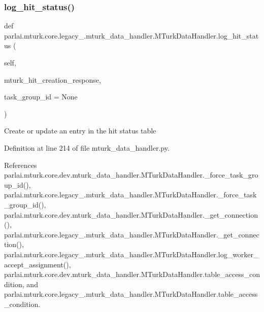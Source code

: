 \subsubsection{\texorpdfstring{log\+\_\+hit\+\_\+status()}{log\_hit\_status()}}
{\footnotesize\ttfamily def parlai.\+mturk.\+core.\+legacy\+\_.\+mturk\+\_\+data\+\_\+handler.\+M\+Turk\+Data\+Handler.\+log\+\_\+hit\+\_\+status (\begin{DoxyParamCaption}\item[{}]{self,  }\item[{}]{mturk\+\_\+hit\+\_\+creation\+\_\+response,  }\item[{}]{task\+\_\+group\+\_\+id = {\ttfamily None} }\end{DoxyParamCaption})}

\begin{DoxyVerb}Create or update an entry in the hit status table\end{DoxyVerb}
 

Definition at line 214 of file mturk\+\_\+data\+\_\+handler.\+py.



References parlai.\+mturk.\+core.\+dev.\+mturk\+\_\+data\+\_\+handler.\+M\+Turk\+Data\+Handler.\+\_\+force\+\_\+task\+\_\+group\+\_\+id(), parlai.\+mturk.\+core.\+legacy\+\_.\+mturk\+\_\+data\+\_\+handler.\+M\+Turk\+Data\+Handler.\+\_\+force\+\_\+task\+\_\+group\+\_\+id(), parlai.\+mturk.\+core.\+dev.\+mturk\+\_\+data\+\_\+handler.\+M\+Turk\+Data\+Handler.\+\_\+get\+\_\+connection(), parlai.\+mturk.\+core.\+legacy\+\_.\+mturk\+\_\+data\+\_\+handler.\+M\+Turk\+Data\+Handler.\+\_\+get\+\_\+connection(), parlai.\+mturk.\+core.\+legacy\+\_.\+mturk\+\_\+data\+\_\+handler.\+M\+Turk\+Data\+Handler.\+log\+\_\+worker\+\_\+accept\+\_\+assignment(), parlai.\+mturk.\+core.\+dev.\+mturk\+\_\+data\+\_\+handler.\+M\+Turk\+Data\+Handler.\+table\+\_\+access\+\_\+condition, and parlai.\+mturk.\+core.\+legacy\+\_.\+mturk\+\_\+data\+\_\+handler.\+M\+Turk\+Data\+Handler.\+table\+\_\+access\+\_\+condition.

